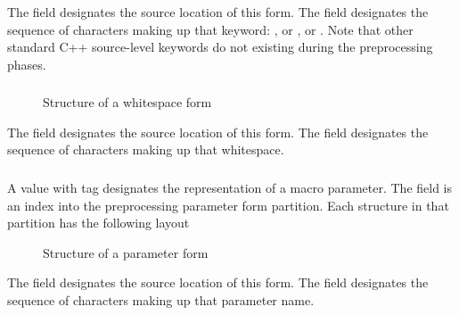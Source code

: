 The field  designates the source location of this form.  The
field  designates the sequence of characters making up that 
keyword: , or , or
.  Note that other standard C++ source-level keywords do
not existing during the preprocessing phases.


\subsubsection{}
\label{sec:ifc:FormSort:Whitespace}

\begin{figure}[H]
  \centering
  \caption{Structure of a whitespace form}
  \label{fig:ifc-whitespace-form}
\end{figure}

The field  designates the source location of this form.  The
field  designates the sequence of characters making up that 
whitespace.



\subsubsection{}
\label{sec:ifc:FormSort:Parameter}

A  value with tag  designates
the representation of a macro parameter.
The  field is an index into
the preprocessing parameter form partition.  Each structure in that partition
has the following layout
%
\begin{figure}[H]
  \centering
  \caption{Structure of a parameter form}
  \label{fig:ifc-parameter-form}
\end{figure}

The field  designates the source location of this form.  The
field  designates the sequence of characters making up that 
parameter name.

